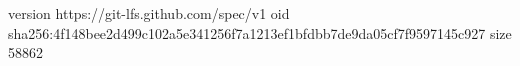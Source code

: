 version https://git-lfs.github.com/spec/v1
oid sha256:4f148bee2d499c102a5e341256f7a1213ef1bfdbb7de9da05cf7f9597145c927
size 58862
